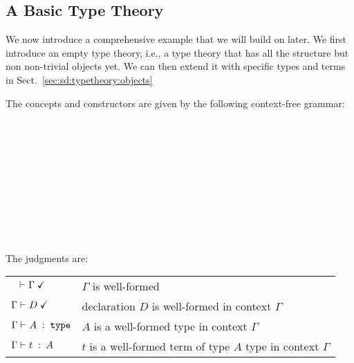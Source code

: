 \subsection{A Basic Type Theory}

We now introduce a comprehensive example that we will build on later.
We first introduce an empty type theory, i.e., a type theory that has all the structure but non non-trivial objects yet.
We can then extend it with specific types and terms in Sect.~\ref{sec:sd:typetheory:objects}

The concepts and constructors are given by the following context-free grammar:

\begin{commgrammar}
\\
\\
\\
\\
\\
\\
\\
\\
\\
\end{commgrammar}

The judgments are:
\begin{center}
	\begin{tabular}{|l|l|}
	  \hline
		$\;\;\;\vdash^{}_{}\Gamma\;\checkmark$           & $\Gamma$ is well-formed\\
		$\Gamma\vdash^{}_{}D\;\checkmark$        & declaration $D$ is well-formed in context $\Gamma$ \\\hline
		$\Gamma\vdash^{}_{}A\;:\;\mathtt{type}$ & $A$ is a well-formed type in context $\Gamma$ \\
		$\Gamma\vdash^{}_{}t\;:\;A$     & $t$ is a well-formed term of type $A$ type in context $\Gamma$ \\
		\hline
	\end{tabular}
\end{center}

